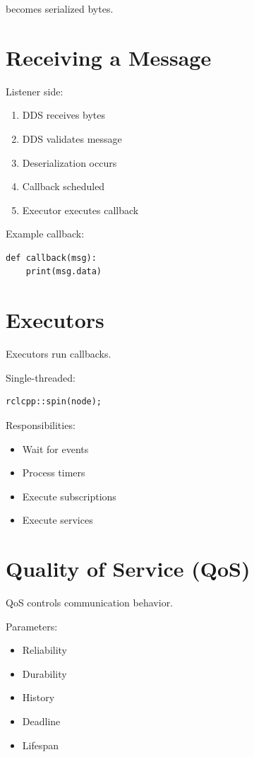\documentclass[11pt]{article}
\begin{document}
becomes serialized bytes.

\section{Receiving a Message}

Listener side:

\begin{enumerate}
\item DDS receives bytes
\item DDS validates message
\item Deserialization occurs
\item Callback scheduled
\item Executor executes callback
\end{enumerate}

Example callback:

\begin{verbatim}
def callback(msg):
    print(msg.data)
\end{verbatim}

\section{Executors}

Executors run callbacks.

Single-threaded:

\begin{verbatim}
rclcpp::spin(node);
\end{verbatim}

Responsibilities:

\begin{itemize}
\item Wait for events
\item Process timers
\item Execute subscriptions
\item Execute services
\end{itemize}

\section{Quality of Service (QoS)}

QoS controls communication behavior.

Parameters:

\begin{itemize}
\item Reliability
\item Durability
\item History
\item Deadline
\item Lifespan
\end{itemize}
\end{document}
